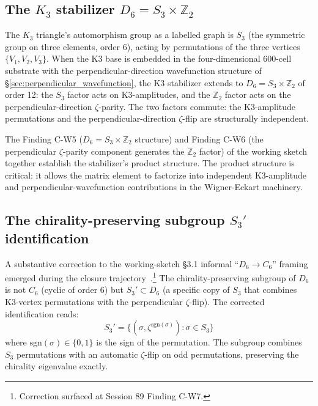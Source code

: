 \documentclass[11pt,letterpaper]{article}
\newcommand{\Kthree}{\ensuremath{K_3}}
\newcommand{\Dsix}{D_6}
\newcommand{\Sthree}{S_3}
\begin{document}
\subsection{The $\Kthree$ stabilizer $\Dsix = \Sthree \times \mathbb{Z}_2$}\label{sec:k3_stabilizer}

The $\Kthree$ triangle's automorphism group as a labelled graph is $\Sthree$ (the symmetric group on three elements, order 6), acting by permutations of the three vertices $\{V_1, V_2, V_3\}$. When the K3 base is embedded in the four-dimensional 600-cell substrate with the perpendicular-direction wavefunction structure of \S\ref{sec:perpendicular_wavefunction}, the K3 stabilizer extends to $\Dsix = \Sthree \times \mathbb{Z}_2$ of order 12: the $\Sthree$ factor acts on K3-amplitudes, and the $\mathbb{Z}_2$ factor acts on the perpendicular-direction $\zeta$-parity. The two factors commute: the K3-amplitude permutations and the perpendicular-direction $\zeta$-flip are structurally independent.

The Finding C-W5 ($\Dsix = \Sthree \times \mathbb{Z}_2$ structure) and Finding C-W6 (the perpendicular $\zeta$-parity component generates the $\mathbb{Z}_2$ factor) of the working sketch~\cite{abshier_capotauro_subclaim_c_sketch} together establish the stabilizer's product structure. The product structure is critical: it allows the matrix element to factorize into independent K3-amplitude and perpendicular-wavefunction contributions in the Wigner-Eckart machinery.

\subsection{The chirality-preserving subgroup $S_3'$ identification}\label{sec:s3_prime}

A substantive correction to the working-sketch §3.1 informal ``$\Dsix \to C_6$'' framing emerged during the closure trajectory~\cite{abshier_capotauro_subclaim_c_sketch}.\footnote{Correction surfaced at Session 89 Finding C-W7.} The chirality-preserving subgroup of $\Dsix$ is not $C_6$ (cyclic of order 6) but $S_3' \subset \Dsix$ (a specific copy of $\Sthree$ that combines K3-vertex permutations with the perpendicular $\zeta$-flip). The corrected identification reads:
\[
S_3' = \{ (\sigma, \zeta^{\text{sgn}(\sigma)}) : \sigma \in \Sthree \}
\]
where $\text{sgn}(\sigma) \in \{0, 1\}$ is the sign of the permutation. The subgroup combines $\Sthree$ permutations with an automatic $\zeta$-flip on odd permutations, preserving the chirality eigenvalue exactly.
\end{document}
